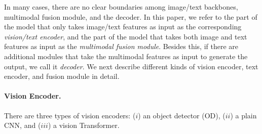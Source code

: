 In many cases, there are no clear boundaries among image/text backbones, multimodal fusion module, and the decoder. In this paper, we refer to the part of the model that only takes image/text features as input as the corresponding \emph{vision/text encoder}, and the part of the model that takes both image and text features as input as the \emph{multimodal fusion module}. Besides this, if there are additional modules that take the multimodal features as input to generate the output, we call it \emph{decoder}. We next describe different kinds of vision encoder, text encoder, and fusion module in detail.

\paragraph{Vision Encoder.} There are three types of vision encoders: ($i$) an object detector (OD), ($ii$) a plain CNN, and ($iii$) a vision Transformer. 
